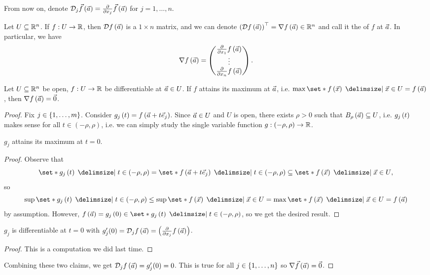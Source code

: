 \documentclass[main.tex]{subfiles}
\begin{document}
From now on, denote $\mathcal{D}_j\vec{f}\left( \vec{a} \right) = \pdv{}{x_j}\vec{f}\left( \vec{a} \right)$ for $j = 1, \ldots , n$.

\begin{definition}
    Let $U\subseteq \mathbb R^n$. If $f : U\to \mathbb R$, then $\mathcal{D}f\left( \vec{a} \right)$ is a $1\times n$ matrix, and we can denote $\left( \mathcal{D} f\left( \vec{a} \right) \right)^\top = \nabla f\left( \vec{a} \right)\in \mathbb R^n$ and call it the  of $f$ at $\vec{a}$. In particular, we have
    \[\nabla f\left( \vec{a} \right) = \begin{pmatrix}
        \pdv{}{x_1}f\left( \vec{a} \right) \\ \vdots \\ \pdv{}{x_n}f\left( \vec{a} \right)
    \end{pmatrix}.\]
\end{definition}

\begin{proposition}
    Let $U\subseteq \mathbb R^n$ be open, $f : U \to \mathbb R$ be differentiable at $\vec{a}\in U$. If $f$ attains its maximum at $\vec{a}$, i.e. $\max\set*{f\parens{\vx} \mid \vx\in U} = f\parens{\va}$, then $\nabla f\left( \vec{a} \right) = \vec{0}$.
\end{proposition}

\begin{proof}
    Fix $j\in \left\{ 1, \ldots , m \right\}$. Consider $g_j\left( t \right) = f\left( \vec{a} + t\vec{e}_j \right)$. Since $\vec{a}\in U$ and $U$ is open, there exists $\rho > 0$ such that $B_\rho\left( \vec{a} \right)\subseteq U$, i.e. $g_j\left( t \right)$ makes sense for all $t\in (-\rho, \rho)$, i.e. we can simply study the single variable function $g : (-\rho, \rho) \to \mathbb R$.
    \begin{claim}
        $g_j$ attains its maximum at $t = 0$.
    \end{claim}
    \begin{proof}
        Observe that
        \[\set*{g_j\parens{t} \mid t\in (-\rho, \rho)} = \set*{f\parens{\va + t\vec{e}_j} \mid t \in (-\rho, \rho)} \subseteq \set*{f\parens{\vx} \mid \vx \in U},\] so
        \[\sup\set*{g_j\parens{t} \mid t\in (-\rho, \rho)}\le \sup\set*{f\parens{\vx} \mid \vec{x}\in U} = \max\set*{f\parens{\vx} \mid \vx \in U} = f\parens{\va}\]
        by assumption. However, $f\parens{\va} = g_j\parens{0} \in \set*{g_j\parens{t} \mid t\in (-\rho,\rho)}$, so we get the desired result.
    \end{proof}

    \begin{claim}
        $g_j$ is differentiable at $t = 0$ with $g_j'(0) = \mathcal{D}_jf\left( \vec{a} \right) = \left( \pdv{}{x_j}f\left( \vec{a} \right) \right)$.
    \end{claim}
    \begin{proof}
        This is a computation we did last time.
    \end{proof}

    Combining these two claims, we get $\mathcal{D}_j f\left( \vec{a} \right) = g'_j(0) = 0$. This is true for all $j\in \left\{ 1, \ldots , n \right\}$ so $\nabla \vec{f}\left( \vec{a} \right) = \vec{0}$.
\end{proof}
\end{document}
